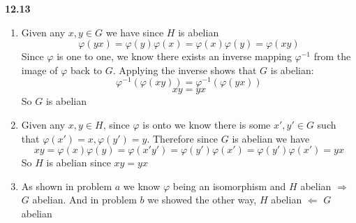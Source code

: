 \documentclass[12pt]{article}
\newenvironment{ques}{\vspace{2 ex}}{\vspace{2 ex}}
\theoremstyle{definition}
\begin{document}
\begin{ques} 
	\textbf{12.13} 
		\begin{enumerate}
			\item
				Given any $x,y \in G$ we have since $H$ is abelian
				$$\varphi(yx) = \varphi (y)\varphi(x) = \varphi
				(x)\varphi(y) = \varphi(xy)$$
				Since $\varphi$ is one to one, we know there
				exists an inverse mapping $\varphi^{-1}$ from
				the image of $\varphi$ back to $G$. Applying
				the inverse shows that $G$ is abelian:
				$$\varphi^{-1}(\varphi(xy)) = \varphi^{-1}(\varphi(yx))$$
				$$xy = yx$$
				So $G$ is abelian
			\item
				Given any $x, y \in H$, since $\varphi$ is onto
				we know there is some $x',y' \in G$ such that
				$\varphi(x') = x, \varphi(y') = y$. Therefore
				since $G$ is abelian we have
				$$xy = \varphi(x)\varphi(y) = \varphi(x'y') =
				\varphi(y')\varphi(x') =
				\varphi(y')\varphi(x') = yx$$
				So $H$ is abelian since $xy = yx$

			\item
				As shown in problem $a$ we know $\varphi$ being
				an isomorphism and $H$ abelian $\Rightarrow$
				$G$ abelian. And in problem $b$ we showed the
				other way, $H$ abelian $\Leftarrow$ $G$
				abelian


		\end{enumerate}
\end{ques}
\end{document}
